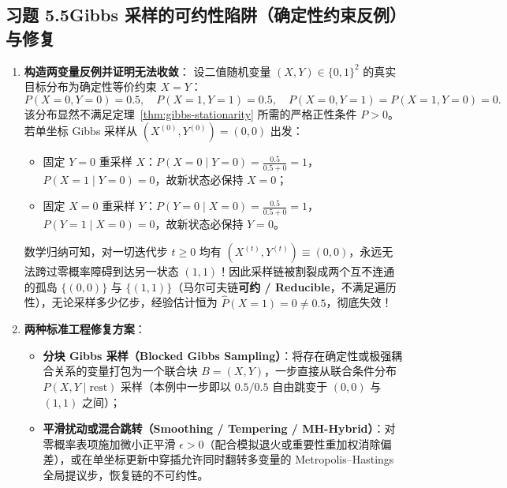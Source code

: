 \subsection*{习题 5.5\quad Gibbs 采样的可约性陷阱（确定性约束反例）与修复}
\begin{enumerate}[label=(\arabic*), leftmargin=1.8em]
  \item \textbf{构造两变量反例并证明无法收敛}：
  设二值随机变量 $(X, Y) \in \{0,1\}^2$ 的真实目标分布为确定性等价约束 $X = Y$：
  \[
    P(X=0, Y=0) = 0.5,\quad P(X=1, Y=1) = 0.5,\quad P(X=0, Y=1) = P(X=1, Y=0) = 0.
  \]
  该分布显然不满足定理~\ref{thm:gibbs-stationarity} 所需的严格正性条件 $P > 0$。若单坐标 Gibbs 采样从 $(X^{(0)}, Y^{(0)}) = (0, 0)$ 出发：
  \begin{itemize}
    \item 固定 $Y=0$ 重采样 $X$：$P(X=0 \mid Y=0) = \frac{0.5}{0.5 + 0} = 1$，$P(X=1 \mid Y=0) = 0$，故新状态必保持 $X=0$；
    \item 固定 $X=0$ 重采样 $Y$：$P(Y=0 \mid X=0) = \frac{0.5}{0.5 + 0} = 1$，$P(Y=1 \mid X=0) = 0$，故新状态必保持 $Y=0$。
  \end{itemize}
  数学归纳可知，对一切迭代步 $t \ge 0$ 均有 $(X^{(t)}, Y^{(t)}) \equiv (0, 0)$，永远无法跨过零概率障碍到达另一状态 $(1, 1)$！因此采样链被割裂成两个互不连通的孤岛 $\{(0,0)\}$ 与 $\{(1,1)\}$（马尔可夫链\textbf{可约 / Reducible}，不满足遍历性），无论采样多少亿步，经验估计恒为 $\hat{P}(X=1) = 0 \neq 0.5$，彻底失效！
  \item \textbf{两种标准工程修复方案}：
  \begin{itemize}
    \item \textbf{分块 Gibbs 采样（Blocked Gibbs Sampling）}：将存在确定性或极强耦合关系的变量打包为一个联合块 $B=(X, Y)$，一步直接从联合条件分布 $P(X, Y \mid \text{rest})$ 采样（本例中一步即以 $0.5/0.5$ 自由跳变于 $(0,0)$ 与 $(1,1)$ 之间）；
    \item \textbf{平滑扰动或混合跳转（Smoothing / Tempering / MH-Hybrid）}：对零概率表项施加微小正平滑 $\epsilon > 0$（配合模拟退火或重要性重加权消除偏差），或在单坐标更新中穿插允许同时翻转多变量的 Metropolis--Hastings 全局提议步，恢复链的不可约性。
  \end{itemize}
\end{enumerate}

